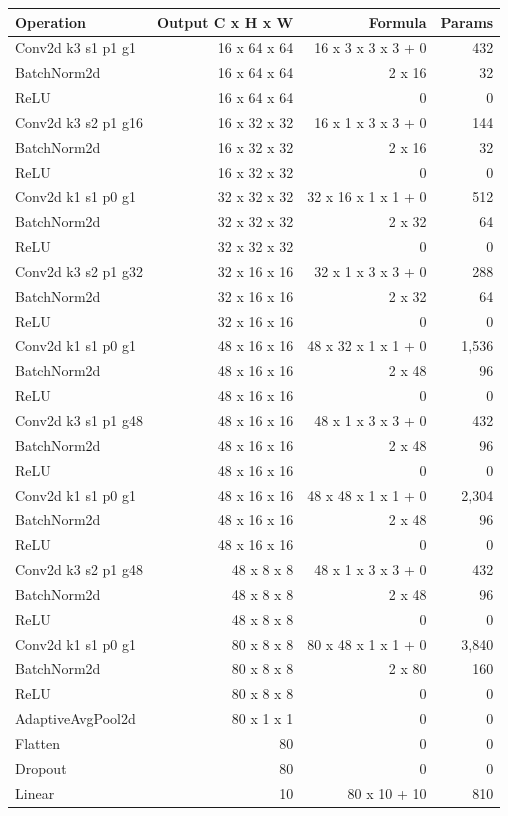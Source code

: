 \begin{tabular}{lrrr}
\toprule
Operation & Output C x H x W & Formula & Params \\
\midrule
Conv2d k3 s1 p1 g1 & 16 x 64 x 64 & 16 x 3 x 3 x 3 + 0 & 432 \\
BatchNorm2d & 16 x 64 x 64 & 2 x 16 & 32 \\
ReLU & 16 x 64 x 64 & 0 & 0 \\
Conv2d k3 s2 p1 g16 & 16 x 32 x 32 & 16 x 1 x 3 x 3 + 0 & 144 \\
BatchNorm2d & 16 x 32 x 32 & 2 x 16 & 32 \\
ReLU & 16 x 32 x 32 & 0 & 0 \\
Conv2d k1 s1 p0 g1 & 32 x 32 x 32 & 32 x 16 x 1 x 1 + 0 & 512 \\
BatchNorm2d & 32 x 32 x 32 & 2 x 32 & 64 \\
ReLU & 32 x 32 x 32 & 0 & 0 \\
Conv2d k3 s2 p1 g32 & 32 x 16 x 16 & 32 x 1 x 3 x 3 + 0 & 288 \\
BatchNorm2d & 32 x 16 x 16 & 2 x 32 & 64 \\
ReLU & 32 x 16 x 16 & 0 & 0 \\
Conv2d k1 s1 p0 g1 & 48 x 16 x 16 & 48 x 32 x 1 x 1 + 0 & 1,536 \\
BatchNorm2d & 48 x 16 x 16 & 2 x 48 & 96 \\
ReLU & 48 x 16 x 16 & 0 & 0 \\
Conv2d k3 s1 p1 g48 & 48 x 16 x 16 & 48 x 1 x 3 x 3 + 0 & 432 \\
BatchNorm2d & 48 x 16 x 16 & 2 x 48 & 96 \\
ReLU & 48 x 16 x 16 & 0 & 0 \\
Conv2d k1 s1 p0 g1 & 48 x 16 x 16 & 48 x 48 x 1 x 1 + 0 & 2,304 \\
BatchNorm2d & 48 x 16 x 16 & 2 x 48 & 96 \\
ReLU & 48 x 16 x 16 & 0 & 0 \\
Conv2d k3 s2 p1 g48 & 48 x 8 x 8 & 48 x 1 x 3 x 3 + 0 & 432 \\
BatchNorm2d & 48 x 8 x 8 & 2 x 48 & 96 \\
ReLU & 48 x 8 x 8 & 0 & 0 \\
Conv2d k1 s1 p0 g1 & 80 x 8 x 8 & 80 x 48 x 1 x 1 + 0 & 3,840 \\
BatchNorm2d & 80 x 8 x 8 & 2 x 80 & 160 \\
ReLU & 80 x 8 x 8 & 0 & 0 \\
AdaptiveAvgPool2d & 80 x 1 x 1 & 0 & 0 \\
Flatten & 80 & 0 & 0 \\
Dropout & 80 & 0 & 0 \\
Linear & 10 & 80 x 10 + 10 & 810 \\
\bottomrule
\end{tabular}
